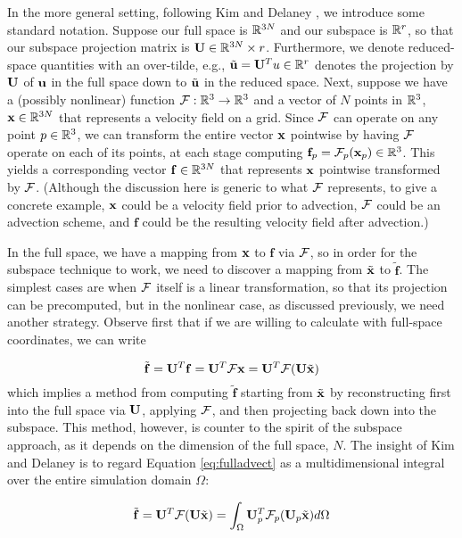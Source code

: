 {In the more general setting, following Kim and Delaney \cite{Kim2013}, we introduce some standard notation. Suppose our full space is $\mathbb{R}^{3N}$ and our subspace is $\mathbb{R}^{r}$, so that our subspace 
projection matrix is $\mathbf{U} \in \mathbb{R}^{3N} \times r$. Furthermore, we denote reduced-space quantities with an over-tilde, e.g., $\tilde{\mathbf{u}} = \mathbf{U}^T u \in \mathbb{R}^{r}$ denotes the projection by $\mathbf{U}$ of $\mathbf{u}$ in the full space 
down to $\tilde{\mathbf{u}}$ in the reduced space. Next, suppose we have a (possibly nonlinear) function $\mathcal{F} : \mathbb{R}^3 \rightarrow \mathbb{R}^3$ and a vector of $N$ points in $\mathbb{R}^3$, $\mathbf{x} \in \mathbb{R}^{3N}$ that represents
a velocity field on a grid. Since $\mathcal{F}$ can operate on any point $p \in \mathbb{R}^3$, we can transform the entire vector $\mathbf{x}$ pointwise by having $\mathcal{F}$ operate on each of its points, at each stage computing $\mathbf{f}_p = \mathcal{F}_p(\mathbf{x}_p) \in \mathbb{R}^3$. This
yields a corresponding vector $\mathbf{f} \in \mathbb{R}^{3N}$ that represents $\mathbf{x}$ pointwise transformed by $\mathcal{F}$. (Although the discussion here is generic to what $\mathcal{F}$ represents, to give a concrete
example, $\mathbf{x}$ could be a velocity field prior to advection, $\mathcal{F}$ could be an advection scheme, and $\mathbf{f}$ could be the resulting velocity field after advection.)

In the full space, we have a mapping from $\mathbf{x}$ to $\mathbf{f}$ via $\mathcal{F}$, so in order for the subspace technique to work, we need to discover a mapping from $\tilde{\mathbf{x}}$ to $\tilde{\mathbf{f}}$. 
The simplest cases are when $\mathcal{F}$ itself is a linear transformation, so that its projection can be precomputed, but in the nonlinear case, as discussed previously, we need another strategy.
Observe first that if we are willing to calculate with full-space coordinates, we can write

\begin{equation}
\label{eq:fulladvect}
\tilde{\mathbf{f}} = \mathbf{U}^T \mathbf{f} = \mathbf{U}^T \mathcal{F} \mathbf{x} = \mathbf{U}^T \mathcal{F}(\mathbf{U}\tilde{\mathbf{x}})
\end{equation}
which implies a method from computing $\tilde{\mathbf{f}}$ starting from $\tilde{\mathbf{x}}$ by reconstructing first into the full space via $\mathbf{U}$, applying $\mathcal{F}$, and then projecting back
down into the subspace. This method, however, is counter to the spirit of the subspace approach, as it depends on the dimension of the full space, $N$. The insight of Kim and Delaney is to regard
Equation \ref{eq:fulladvect} as a multidimensional integral over the entire simulation domain $\Omega$:

\begin{equation}
\label{eq:integral}
\tilde{\mathbf{f}} = \mathbf{U}^T \mathcal{F}(\mathbf{U}\tilde{\mathbf{x}}) = \int_{\Omega} \mathbf{U}_p^T \mathcal{F}_p(\mathbf{U}_p \tilde{\mathbf{x}})d\Omega
\end{equation}

}
